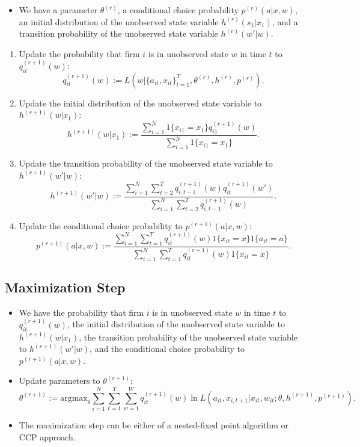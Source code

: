 \documentclass[]{book}
\providecommand{\tightlist}{%
  \setlength{\itemsep}{0pt}\setlength{\parskip}{0pt}}
\begin{document}
\begin{itemize}
\tightlist
\item
  We have a parameter \(\theta^{(r)}\), a conditional choice probability
  \(p^{(r)}(a|x, w)\), an initial distribution of the unobserved state
  variable \(h^{(r)}(s_1|x_1)\), and a transition probability of the
  unobserved state variable \(h^{(r)}(w'|w)\).
\end{itemize}

\begin{enumerate}
\def\labelenumi{\arabic{enumi}.}
\tightlist
\item
  Update the probability that firm \(i\) is in unobserved state \(w\) in
  time \(t\) to \(q_{it}^{(r + 1)}(w)\): \[
  q_{it}^{(r + 1)}(w) := L(w|\{a_{it}, x_{it}\}_{t = 1}^T, \theta^{(r)}, h^{(r)}, p^{(r)}).
  \]
\item
  Update the initial distribution of the unobserved state variable to
  \(h^{(r + 1)}(w|x_1)\): \[
  h^{(r + 1)}(w|x_1) := \frac{\sum_{i = 1}^N 1\{x_{i1} = x_1\} q_{i1}^{(r + 1)}(w)}{\sum_{i = 1}^N 1\{x_{i1} = x_1\}}.
  \]
\item
  Update the transition probability of the unobserved state variable to
  \(h^{(r + 1)}(w'|w)\): \[
  h^{(r + 1)}(w'|w) := \frac{\sum_{i = 1}^N \sum_{t = 2}^T q_{i, t - 1}^{(r + 1)}(w) q_{it}^{(r + 1)}(w')}{\sum_{i = 1}^N \sum_{t = 2}^T q_{i, t - 1}^{(r + 1)}(w)}.
  \]
\item
  Update the conditional choice probability to \(p^{(r + 1)}(a|x, w)\):
  \[
  p^{(r + 1)}(a|x, w) := \frac{\sum_{i = 1}^N \sum_{t = 1}^T q_{it}^{(r + 1)}(w) 1\{x_{it} = x\}1\{a_{it} = a\}}{\sum_{i = 1}^N \sum_{t = 1}^T q_{it}^{(r + 1)}(w) 1\{x_{it} = x\}}.
  \]
\end{enumerate}

\subsection{Maximization Step}\label{maximization-step}

\begin{itemize}
\tightlist
\item
  We have the probability that firm \(i\) is in unobserved state \(w\)
  in time \(t\) to \(q_{it}^{(r + 1)}(w)\), the initial distribution of
  the unobserved state variable to \(h^{(r + 1)}(w|x_1)\), the
  transition probability of the unobserved state variable to
  \(h^{(r + 1)}(w'|w)\), and the conditional choice probability to
  \(p^{(r + 1)}(a|x, w)\).
\item
  Update parameters to \(\theta^{(r + 1)}\): \[
  \theta^{(r + 1)} := \text{argmax}_{\theta} \sum_{i = 1}^N \sum_{t = 1}^T \sum_{w = 1}^W q_{it}^{(r + 1)}(w) \ln L(a_{it}, x_{i, t + 1}|x_{it}, w_{it}; \theta, h^{(r + 1)}, p^{(r + 1)}).
  \]
\item
  The maximization step can be either of a nested-fixed point algorithm
  or CCP approach.
\end{itemize}
\end{document}
